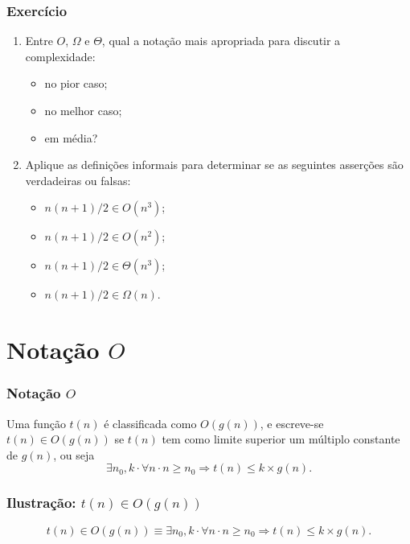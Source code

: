 \documentclass{beamer}
\begin{document}
\begin{frame}
\frametitle{Exercício}
\begin{enumerate}
\item Entre $O$, $\Omega$ e $\Theta$, qual a notação mais apropriada para discutir a complexidade:
\begin{itemize}
\item no pior caso;
\item no melhor caso;
\item em média?
\end{itemize}
\item Aplique as definições informais para determinar se as seguintes asserções
  são verdadeiras ou falsas:
\begin{itemize}
  \item $n(n+1)/2 \in O(n^3)$;
  \item $n(n+1)/2 \in O(n^2)$;
  \item $n(n+1)/2 \in \Theta(n^3)$;
  \item $n(n+1)/2 \in \Omega(n)$.
\end{itemize}
\end{enumerate}
\end{frame}

\section{Notação \texorpdfstring{$O$}{Big Oh}}

\begin{frame}
\frametitle{Notação $O$}
\begin{definition}
Uma função $t(n)$ é classificada como $O(g(n))$, e escreve-se $t(n) \in O(g(n))$ se $t(n)$ tem como limite superior um múltiplo constante de $g(n)$, ou seja
$$
\exists n_0, k \cdot \forall n \cdot n \ge n_0 \Rightarrow t(n) \le k \times g(n).
$$
\end{definition}
\end{frame}

\begin{frame}
  \frametitle{Ilustração: $t(n) \in O(g(n))$}
  \begin{center}
    
  \end{center}
$$
t(n) \in O(g(n)) \equiv \exists n_0, k \cdot \forall n \cdot n \ge n_0 \Rightarrow t(n) \le k \times g(n).
$$
\end{frame}
\end{document}
